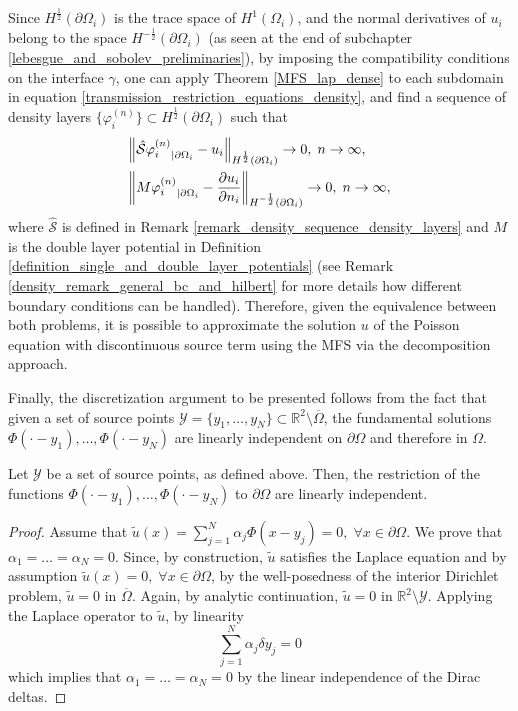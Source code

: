 Since \(H^\frac{1}{2}(\partial \Omega_i)\) is the trace space of \(H^1(\Omega_i)\), and the normal derivatives of \(u_i\) belong to the space \(H^{-\frac{1}{2}}(\partial\Omega_i)\) (as seen at the end of subchapter \ref{lebesgue_and_sobolev_preliminaries}), by imposing the compatibility conditions on the interface \(\gamma\), one can apply Theorem \ref{MFS_lap_dense} to each subdomain in equation \eqref{transmission_restriction_equations_density}, and find a sequence of density layers \(\{\varphi^{(n)}_i\} \subset H^{\frac{1}{2}}(\partial\Omega_i)\) such that
\begin{align*}
    &\norm{{\hat{\mathcal{S}}\varphi^{(n)}_i}_{|\partial\Omega_i} - u_i}_{H^\frac{1}{2}(\partial\Omega_i)} \rightarrow 0, \; n \rightarrow \infty,\\
    &\norm{{M\varphi^{(n)}_i}_{|\partial\Omega_i} - \frac{\partial u_i}{\partial n_i}}_{H^{-\frac{1}{2}}(\partial\Omega_i)} \rightarrow 0, \; n \rightarrow \infty,
\end{align*}
where \(\hat{\mathcal{S}}\) is defined in Remark \ref{remark_density_sequence_density_layers} and \(M\) is the double layer potential in Definition \ref{definition_single_and_double_layer_potentials} (see Remark \ref{density_remark_general_bc_and_hilbert} for more details how different boundary conditions can be handled). Therefore, given the equivalence between both problems, it is possible to approximate the solution \(u\) of the Poisson equation with discontinuous source term using the \ac{MFS} via the decomposition approach.

Finally, the discretization argument to be presented follows from the fact that given a set of source points \(\mathcal{Y} = \{y_1,\dots, y_N\} \subset \mathbb{R}^2\setminus\overline{\Omega}\), the fundamental solutions \(\Phi(\cdot-y_1),\dots,\Phi(\cdot-y_N)\) are linearly independent on \(\partial \Omega\) and therefore in \(\Omega\).
\begin{theorem}\label{lapl_li}
    Let \(\mathcal{Y}\) be a set of source points, as defined above. Then, the restriction of the functions \(\Phi(\cdot-y_1),\dots,\Phi(\cdot-y_N)\) to \(\partial\Omega\) are linearly independent.
\end{theorem}
\begin{proof}
    Assume that \(\tilde{u}(x) = \sum_{j=1}^{N}\alpha_j \Phi(x-y_j) = 0, \; \forall x \in \partial\Omega\). We prove that \(\alpha_1=\dots=\alpha_N = 0\). Since, by construction, \(\tilde{u}\) satisfies the Laplace equation and by assumption \(\tilde{u}(x) = 0, \; \forall x \in \partial\Omega\), by the well-posedness of the interior Dirichlet problem, \(\tilde{u} = 0\) in \(\overline{\Omega}\). Again, by analytic continuation, \(\tilde{u} = 0\) in \(\mathbb{R}^2\setminus\mathcal{Y}\). Applying the Laplace operator to \(\tilde{u}\), by linearity
    \[
        \sum_{j=1}^{N}\alpha_j \delta{y_j} = 0
    \]
    which implies that \(\alpha_1=\dots=\alpha_N = 0\) by the linear independence of the Dirac deltas.
\end{proof}

